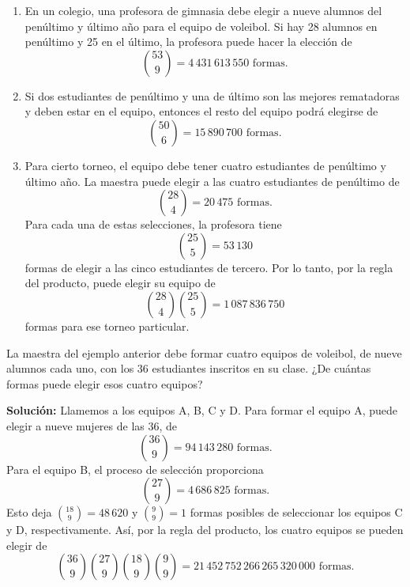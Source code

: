 \begin{myexample}
    \begin{enumerate}[label=\alph*)]
        \item En un colegio, una profesora de gimnasia debe elegir a nueve alumnos del penúltimo y último año para el equipo de voleibol. Si hay 28 alumnos en penúltimo y 25 en el último, la profesora puede hacer la elección de
        $$\binom{53}{9} = 4 \, 431 \, 613 \, 550 \text{ formas.}$$
        \item Si dos estudiantes de penúltimo y una de último son las mejores rematadoras y deben estar en el equipo, entonces el resto del equipo podrá elegirse de
        $$\binom{50}{6} = 15 \, 890 \, 700 \text{ formas.}$$
        \item Para cierto torneo, el equipo debe tener cuatro estudiantes de penúltimo y último año. La maestra puede elegir a las cuatro estudiantes de penúltimo de
        $$\binom{28}{4} = 20 \, 475 \text{ formas.}$$
        Para cada una de estas selecciones, la profesora tiene
        $$\binom{25}{5} = 53 \, 130$$
        formas de elegir a las cinco estudiantes de tercero. Por lo tanto, por la regla del producto, puede elegir su equipo de
        $$\binom{28}{4} \binom{25}{5} = 1 \, 087 \, 836 \, 750$$
        formas para ese torneo particular.
    \end{enumerate}
\end{myexample}

\begin{myexample}
    La maestra del ejemplo anterior debe formar cuatro equipos de voleibol, de nueve alumnos cada uno, con los 36 estudiantes inscritos en su clase. ¿De cuántas formas puede elegir esos cuatro equipos?

    \tcblower
    \textbf{\color{jblueleft}Solución:} Llamemos a los equipos A, B, C y D. Para formar el equipo A, puede elegir a nueve mujeres de las 36, de
    $$\binom{36}{9} = 94 \, 143 \, 280 \text{ formas.}$$
    Para el equipo B, el proceso de selección proporciona
    $$\binom{27}{9} = 4 \, 686 \, 825 \text{ formas.}$$
    Esto deja $\displaystyle \binom{18}{9} = 48 \, 620 $ y $\displaystyle \binom{9}{9} = 1$ formas posibles de seleccionar los equipos C y D, respectivamente. Así, por la regla del producto, los cuatro equipos se pueden elegir de
    $$\binom{36}{9} \binom{27}{9} \binom{18}{9} \binom{9}{9} = 21 \, 452 \, 752 \, 266 \, 265 \, 320 \, 000 \text{ formas.}$$
\end{myexample}

\newpage

